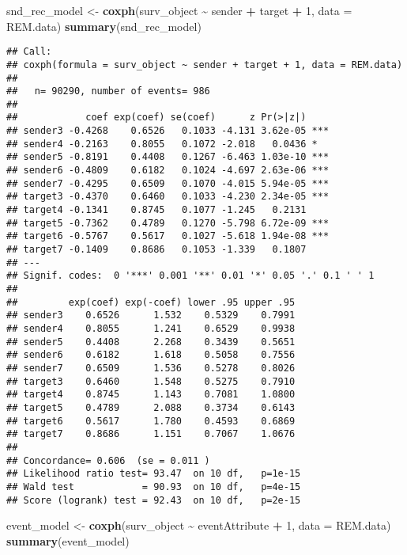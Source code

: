 \documentclass[
]{article}
\newenvironment{Shaded}{\begin{snugshade}}{\end{snugshade}}
\newcommand{\AttributeTok}[1]{\textcolor[rgb]{0.13,0.29,0.53}{#1}}
\newcommand{\DecValTok}[1]{\textcolor[rgb]{0.00,0.00,0.81}{#1}}
\newcommand{\FunctionTok}[1]{\textcolor[rgb]{0.13,0.29,0.53}{\textbf{#1}}}
\newcommand{\NormalTok}[1]{#1}
\newcommand{\OtherTok}[1]{\textcolor[rgb]{0.56,0.35,0.01}{#1}}
\newcommand{\SpecialCharTok}[1]{\textcolor[rgb]{0.81,0.36,0.00}{\textbf{#1}}}
\begin{document}
\begin{Shaded}
\begin{Highlighting}[]
\NormalTok{snd\_rec\_model }\OtherTok{\textless{}{-}} \FunctionTok{coxph}\NormalTok{(surv\_object }\SpecialCharTok{\textasciitilde{}}\NormalTok{ sender }\SpecialCharTok{+}\NormalTok{ target }\SpecialCharTok{+} \DecValTok{1}\NormalTok{, }\AttributeTok{data =}\NormalTok{ REM.data)}
\FunctionTok{summary}\NormalTok{(snd\_rec\_model)}
\end{Highlighting}
\end{Shaded}

\begin{verbatim}
## Call:
## coxph(formula = surv_object ~ sender + target + 1, data = REM.data)
## 
##   n= 90290, number of events= 986 
## 
##            coef exp(coef) se(coef)      z Pr(>|z|)    
## sender3 -0.4268    0.6526   0.1033 -4.131 3.62e-05 ***
## sender4 -0.2163    0.8055   0.1072 -2.018   0.0436 *  
## sender5 -0.8191    0.4408   0.1267 -6.463 1.03e-10 ***
## sender6 -0.4809    0.6182   0.1024 -4.697 2.63e-06 ***
## sender7 -0.4295    0.6509   0.1070 -4.015 5.94e-05 ***
## target3 -0.4370    0.6460   0.1033 -4.230 2.34e-05 ***
## target4 -0.1341    0.8745   0.1077 -1.245   0.2131    
## target5 -0.7362    0.4789   0.1270 -5.798 6.72e-09 ***
## target6 -0.5767    0.5617   0.1027 -5.618 1.94e-08 ***
## target7 -0.1409    0.8686   0.1053 -1.339   0.1807    
## ---
## Signif. codes:  0 '***' 0.001 '**' 0.01 '*' 0.05 '.' 0.1 ' ' 1
## 
##         exp(coef) exp(-coef) lower .95 upper .95
## sender3    0.6526      1.532    0.5329    0.7991
## sender4    0.8055      1.241    0.6529    0.9938
## sender5    0.4408      2.268    0.3439    0.5651
## sender6    0.6182      1.618    0.5058    0.7556
## sender7    0.6509      1.536    0.5278    0.8026
## target3    0.6460      1.548    0.5275    0.7910
## target4    0.8745      1.143    0.7081    1.0800
## target5    0.4789      2.088    0.3734    0.6143
## target6    0.5617      1.780    0.4593    0.6869
## target7    0.8686      1.151    0.7067    1.0676
## 
## Concordance= 0.606  (se = 0.011 )
## Likelihood ratio test= 93.47  on 10 df,   p=1e-15
## Wald test            = 90.93  on 10 df,   p=4e-15
## Score (logrank) test = 92.43  on 10 df,   p=2e-15
\end{verbatim}

\begin{Shaded}
\begin{Highlighting}[]
\NormalTok{event\_model }\OtherTok{\textless{}{-}} \FunctionTok{coxph}\NormalTok{(surv\_object }\SpecialCharTok{\textasciitilde{}}\NormalTok{ eventAttribute }\SpecialCharTok{+} \DecValTok{1}\NormalTok{, }\AttributeTok{data =}\NormalTok{ REM.data)}
\FunctionTok{summary}\NormalTok{(event\_model)}
\end{Highlighting}
\end{Shaded}
\end{document}
